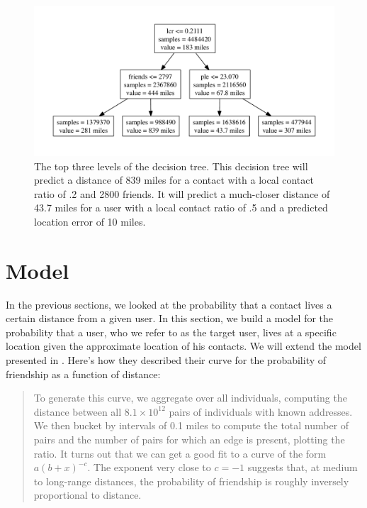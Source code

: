 \begin{figure}[tbh]
\centering
\includegraphics[width=\linewidth]{figures/tree_top.pdf}
\caption{
    The top three levels of the decision tree. This decision tree will predict a
    distance of 839 miles for a contact with a local contact ratio of .2 and
    2800 friends. It will predict a much-closer distance of 43.7 miles for a
    user with a local contact ratio of .5 and a predicted location error of 10
    miles.
}
\label{fig:TreeTop}
\end{figure}

\section{Model}
\label{sec:model}

In the previous sections, we looked at the probability that a contact lives a
certain distance from a given user.
%
In this section, we build a model for the probability that a user, who we refer
to as the target user, lives at a specific location given the approximate
location of his contacts.
%
We will extend the model presented in \cite{backstrom2010find}.
%
Here's how they described their curve for the probability of friendship as a
function of distance:
\begin{quote}
To generate this curve, we aggregate over all individuals, computing the
distance between all $8.1 \times 10^{12}$ pairs of individuals with known
addresses.
We then bucket by intervals of 0.1 miles to compute the total number of pairs
and the number of pairs for which an edge is present, plotting the ratio. It
turns out that we can get a good fit to a curve of the form $a(b+x)^{-c}$.
The exponent very close to $c=-1$ suggests that, at medium to long-range
distances, the probability of friendship is roughly inversely proportional to
distance.
\end{quote}

